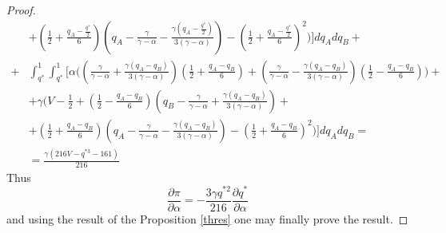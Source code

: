 \documentclass[a4paper]{article}
\begin{document}
\begin{proof}
\begin{align*}
		&+ \left(\frac{1}{2} + \frac{q_A-\frac{q^*}{2}}{6} \right) \left(q_A - \frac{\gamma}{\gamma - \alpha} - \frac{\gamma \left(q_A- \frac{q^*}{2} \right)}{3(\gamma - \alpha)} \right)  - \left( \frac{1}{2} + \frac{q_A - \frac{q^*}{2}}{6} \right)^2 \biggr)  \biggr] dq_A dq_B + \\
		+
		&\int_{q^*}^{1} \int_{q^*}^{1} \biggl[ \alpha \biggl( \left( \frac{\gamma}{\gamma - \alpha} + \frac{\gamma\left(q_A - q_B \right) }{3(\gamma - \alpha)} \right)\left(\frac{1}{2} + \frac{q_A - q_B}{6} \right) + \left( \frac{\gamma}{\gamma - \alpha} - \frac{\gamma\left(q_A- q_B \right) }{3(\gamma - \alpha)} \right)\left(\frac{1}{2} - \frac{q_A -q_B}{6} \right) \biggr)+\\
		&+\gamma \biggl(V - \frac{1}{2} + \left(\frac{1}{2} - \frac{q_A-q_B}{6} \right) \left( q_B - \frac{\gamma}{\gamma - \alpha} + \frac{\gamma \left(q_A -  q_B \right)}{3 (\gamma - \alpha)} \right)  + \\
		&+ \left(\frac{1}{2} + \frac{q_A-q_B}{6} \right) \left(q_A - \frac{\gamma}{\gamma - \alpha} - \frac{\gamma \left(q_A- q_B \right)}{3(\gamma - \alpha)} \right)  - \left( \frac{1}{2} + \frac{q_A - q_B}{6} \right)^2 \biggr)  \biggr] dq_A dq_B = \\
		& = \frac{\gamma(216 V - q^{*3} - 161)}{216}
		\end{align*}
		Thus $$\frac{\partial \pi}{\partial \alpha} = -\frac{3 \gamma q^{*2}}{216} \frac{\partial q^*}{\partial \alpha}$$ and using the result of the Proposition \ref{thres} one may finally prove the result.
	\end{proof}
	{}
	
\end{document}
